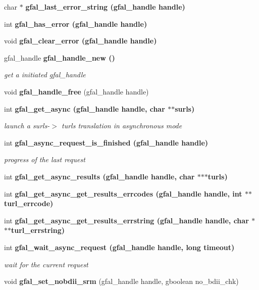 \begin{CompactItemize}
\item 
char $\ast$ \bf{gfal\_\-last\_\-error\_\-string} (gfal\_\-handle handle)
\item 
int \bf{gfal\_\-has\_\-error} (gfal\_\-handle handle)
\item 
void \bf{gfal\_\-clear\_\-error} (gfal\_\-handle handle)
\item 
gfal\_\-handle \bf{gfal\_\-handle\_\-new} ()
\begin{CompactList}\small\item\em get a initiated gfal\_\-handle \item\end{CompactList}\item 
void \textbf{gfal\_\-handle\_\-free} (gfal\_\-handle handle)\label{gfal__common__interface_8h_0071cb3665f7dca9648fa46bebeca524}

\item 
int \bf{gfal\_\-get\_\-async} (gfal\_\-handle handle, char $\ast$$\ast$surls)
\begin{CompactList}\small\item\em launch a surls-$>$ turls translation in asynchronous mode \item\end{CompactList}\item 
int \bf{gfal\_\-async\_\-request\_\-is\_\-finished} (gfal\_\-handle handle)
\begin{CompactList}\small\item\em progress of the last request \item\end{CompactList}\item 
int \bf{gfal\_\-get\_\-async\_\-results} (gfal\_\-handle handle, char $\ast$$\ast$$\ast$turls)
\item 
int \bf{gfal\_\-get\_\-async\_\-get\_\-results\_\-errcodes} (gfal\_\-handle handle, int $\ast$$\ast$turl\_\-errcode)
\item 
int \bf{gfal\_\-get\_\-async\_\-get\_\-results\_\-errstring} (gfal\_\-handle handle, char $\ast$$\ast$$\ast$turl\_\-errstring)
\item 
int \bf{gfal\_\-wait\_\-async\_\-request} (gfal\_\-handle handle, long timeout)
\begin{CompactList}\small\item\em wait for the current request \item\end{CompactList}\item 
void \textbf{gfal\_\-set\_\-nobdii\_\-srm} (gfal\_\-handle handle, gboolean no\_\-bdii\_\-chk)\label{gfal__common__interface_8h_5e3afd0690b23dedf14d6fa7898f28a9}

\end{CompactItemize}


